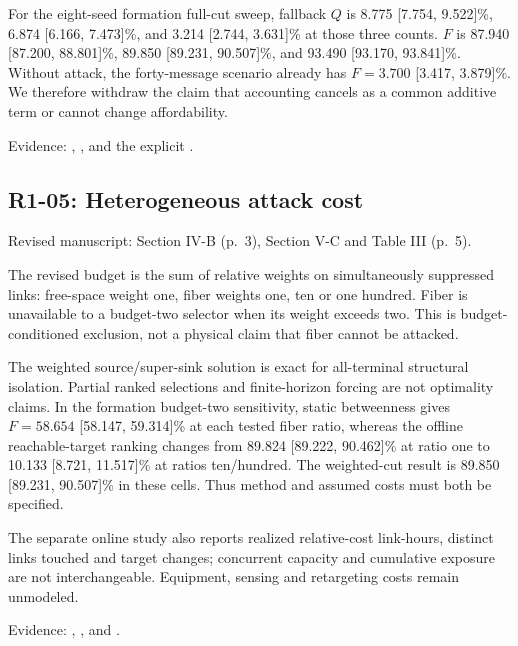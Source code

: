 For the eight-seed formation full-cut sweep, fallback \(Q\) is 8.775 {[}7.754, 9.522{]}\%, 6.874 {[}6.166, 7.473{]}\%, and 3.214 {[}2.744, 3.631{]}\% at those three counts. \(F\) is 87.940 {[}87.200, 88.801{]}\%, 89.850 {[}89.231, 90.507{]}\%, and 93.490 {[}93.170, 93.841{]}\%. Without attack, the forty-message scenario already has \(F=3.700\) {[}3.417, 3.879{]}\%. We therefore withdraw the claim that accounting cancels as a common additive term or cannot change affordability.

Evidence: , , and the explicit .

\subsection{R1-05: Heterogeneous attack cost}\label{r1-05-heterogeneous-attack-cost}

Revised manuscript: Section IV-B (p.~3), Section V-C and Table III (p.~5).

The revised budget is the sum of relative weights on simultaneously suppressed links: free-space weight one, fiber weights one, ten or one hundred. Fiber is unavailable to a budget-two selector when its weight exceeds two. This is budget-conditioned exclusion, not a physical claim that fiber cannot be attacked.

The weighted source/super-sink solution is exact for all-terminal structural isolation. Partial ranked selections and finite-horizon forcing are not optimality claims. In the formation budget-two sensitivity, static betweenness gives \(F=58.654\) {[}58.147, 59.314{]}\% at each tested fiber ratio, whereas the offline reachable-target ranking changes from 89.824 {[}89.222, 90.462{]}\% at ratio one to 10.133 {[}8.721, 11.517{]}\% at ratios ten/hundred. The weighted-cut result is 89.850 {[}89.231, 90.507{]}\% in these cells. Thus method and assumed costs must both be specified.

The separate online study also reports realized relative-cost link-hours, distinct links touched and target changes; concurrent capacity and cumulative exposure are not interchangeable. Equipment, sensing and retargeting costs remain unmodeled.

Evidence: , , and .

